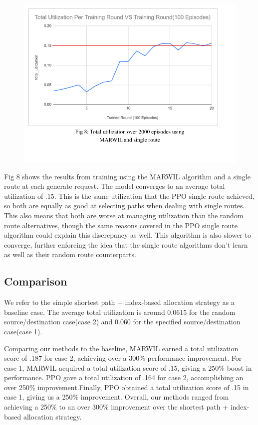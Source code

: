 \documentclass[conference]{IEEEtran}
\begin{document}
\begin{flushleft}
\begin{figure}[ht!]
    \includegraphics[width=.75\linewidth]{Final Paper Results And Graphs (7).png}
\end{figure}
Fig 8 shows the results from training using the MARWIL algorithm and a single route at each generate request. The model converges to an average total utilization of .15. This is the same utilization that the PPO single route achieved, so both are equally as good at selecting paths when dealing with single routes. This also means that both are worse at managing utilization than the random route alternatives, though the same reasons covered in the PPO single route algorithm could explain this discrepancy as well. This algorithm is also slower to converge, further enforcing the idea that the single route algorithms don't learn as well as their random route counterparts. 
\end{flushleft}
\subsection{Comparison}
We refer to the simple shortest path + index-based allocation strategy as a baseline case. The average total utilization is around 0.0615 for the random source/destination case(case 2) and 0.060 for the specified source/destination case(case 1).

Comparing our methods to the baseline, MARWIL earned a total utilization score of .187 for case 2, achieving over a 300\%  performance improvement. For case 1, MARWIL acquired a total utilization score of .15,  giving a 250\% boost in performance. PPO gave a total utilization of .164 for case 2, accomplishing an over 250\% improvement.Finally, PPO obtained a total utilization score of .15 in case 1, giving us a 250\% improvement. Overall, our methods ranged from achieving a 250\% to an over 300\% improvement over the shortest path + index-based allocation strategy.
\end{document}
